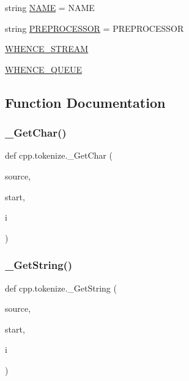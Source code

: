 \begin{DoxyCompactItemize}
\item 
string \mbox{\hyperlink{namespacecpp_1_1tokenize_aa14251ded979d72f93d7b234d8cfb584}{N\+A\+ME}} = \textquotesingle{}N\+A\+ME\textquotesingle{}
\item 
string \mbox{\hyperlink{namespacecpp_1_1tokenize_a3c8918ee13b9acf5ea4e70b484d67268}{P\+R\+E\+P\+R\+O\+C\+E\+S\+S\+OR}} = \textquotesingle{}P\+R\+E\+P\+R\+O\+C\+E\+S\+S\+OR\textquotesingle{}
\item 
\mbox{\hyperlink{namespacecpp_1_1tokenize_a8dd117207e391864f7d9cb656e826a9e}{W\+H\+E\+N\+C\+E\+\_\+\+S\+T\+R\+E\+AM}}
\item 
\mbox{\hyperlink{namespacecpp_1_1tokenize_ad02466a473c5e9c2ac256e18209f0967}{W\+H\+E\+N\+C\+E\+\_\+\+Q\+U\+E\+UE}}
\end{DoxyCompactItemize}


\subsection{Function Documentation}
\mbox{\label{namespacecpp_1_1tokenize_abeb75f493bd3035922daf150f5213ba9}} 
\subsubsection{\texorpdfstring{\_GetChar()}{\_GetChar()}}
{\footnotesize\ttfamily def cpp.\+tokenize.\+\_\+\+Get\+Char (\begin{DoxyParamCaption}\item[{}]{source,  }\item[{}]{start,  }\item[{}]{i }\end{DoxyParamCaption})\hspace{0.3cm}{\ttfamily [private]}}

\mbox{\label{namespacecpp_1_1tokenize_a3c6a8b154110b4b6a0385ccc3469db77}} 
\subsubsection{\texorpdfstring{\_GetString()}{\_GetString()}}
{\footnotesize\ttfamily def cpp.\+tokenize.\+\_\+\+Get\+String (\begin{DoxyParamCaption}\item[{}]{source,  }\item[{}]{start,  }\item[{}]{i }\end{DoxyParamCaption})\hspace{0.3cm}{\ttfamily [private]}}

